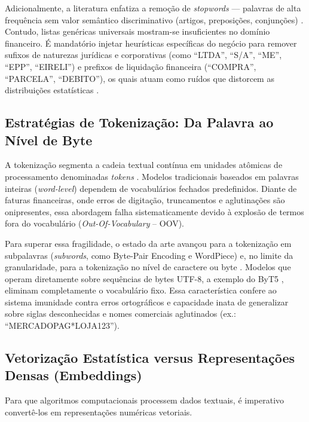 \documentclass[
	12pt,				
	openright,			
	oneside,			
	a4paper,			
	english,			
	brazil				
	]{abntex2}
\begin{document}
Adicionalmente, a literatura enfatiza a remoção de \textit{stopwords} — palavras de alta frequência sem valor semântico discriminativo (artigos, preposições, conjunções) \cite{matos2010pre}. Contudo, listas genéricas universais mostram-se insuficientes no domínio financeiro. É mandatório injetar heurísticas específicas do negócio para remover sufixos de naturezas jurídicas e corporativas (como ``LTDA'', ``S/A'', ``ME'', ``EPP'', ``EIRELI'') e prefixos de liquidação financeira (``COMPRA'', ``PARCELA'', ``DEBITO''), os quais atuam como ruídos que distorcem as distribuições estatísticas \cite{santos2023classificacao}.

\subsection{Estratégias de Tokenização: Da Palavra ao Nível de Byte}
A tokenização segmenta a cadeia textual contínua em unidades atômicas de processamento denominadas \textit{tokens} \cite{BPLN_livro:2024}. Modelos tradicionais baseados em palavras inteiras (\textit{word-level}) dependem de vocabulários fechados predefinidos. Diante de faturas financeiras, onde erros de digitação, truncamentos e aglutinações são onipresentes, essa abordagem falha sistematicamente devido à explosão de termos fora do vocabulário (\textit{Out-Of-Vocabulary} -- OOV).

Para superar essa fragilidade, o estado da arte avançou para a tokenização em subpalavras (\textit{subwords}, como Byte-Pair Encoding e WordPiece) e, no limite da granularidade, para a tokenização no nível de caractere ou byte \cite{xue2021byt5, zhang2021mineracao}. Modelos que operam diretamente sobre sequências de bytes UTF-8, a exemplo do ByT5 \cite{xue2021byt5}, eliminam completamente o vocabulário fixo. Essa característica confere ao sistema imunidade contra erros ortográficos e capacidade inata de generalizar sobre siglas desconhecidas e nomes comerciais aglutinados (ex.: ``MERCADOPAG*LOJA123'').

\subsection{Vetorização Estatística versus Representações Densas (Embeddings)}
Para que algoritmos computacionais processem dados textuais, é imperativo convertê-los em representações numéricas vetoriais.
\end{document}
